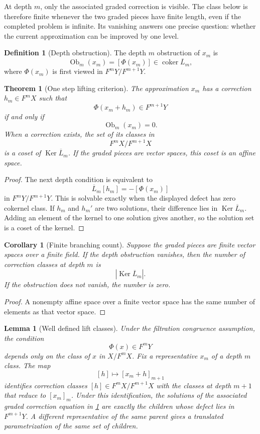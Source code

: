 \documentclass{aomart}
\newtheorem{theorem}{Theorem}[section]
\newtheorem{lemma}[lemma]{Lemma}
\newtheorem{corollary}[corollary]{Corollary}
\theoremstyle{definition}
\newtheorem{definition}[definition]{Definition}
\theoremstyle{remark}
\newcommand{\Ker}{\operatorname{Ker}}
\newcommand{\coker}{\operatorname{coker}}
\newcommand{\Ob}{\operatorname{Ob}}
\begin{document}
At depth $m$, only the associated graded correction is visible.  The class below is therefore finite whenever the two graded pieces have finite length, even if the completed problem is infinite.  Its vanishing answers one precise question: whether the current approximation can be improved by one level.

\begin{definition}[Depth obstruction]\label{def:depth_obstruction}
The depth $m$ obstruction of $x_m$ is
\[
\Ob_m(x_m)
=
[\Phi(x_m)]
\in
\coker\overline L_m,
\]
where $\Phi(x_m)$ is first viewed in $F^mY/F^{m+1}Y$.
\end{definition}

\begin{theorem}[One step lifting criterion]\label{thm:one_step_lifting}
The approximation $x_m$ has a correction $h_m\in F^mX$ such that
\[
\Phi(x_m+h_m)\in F^{m+1}Y
\]
if and only if
\[
\Ob_m(x_m)=0.
\]
When a correction exists, the set of its classes in
\[
F^mX/F^{m+1}X
\]
is a coset of $\Ker\overline L_m$.  If the graded pieces are vector spaces, this coset is an affine space.
\end{theorem}

\begin{proof}
The next depth condition is equivalent to
\[
\overline L_m[h_m]
=-[\Phi(x_m)]
\]
in $F^mY/F^{m+1}Y$.  This is solvable exactly when the displayed defect has zero cokernel class.  If $h_m$ and $h_m'$ are two solutions, their difference lies in $\Ker\overline L_m$.  Adding an element of the kernel to one solution gives another, so the solution set is a coset of the kernel.
\end{proof}

\begin{corollary}[Finite branching count]\label{cor:finite_branch_count}
Suppose the graded pieces are finite vector spaces over a finite field.  If the depth obstruction vanishes, then the number of correction classes at depth $m$ is
\[
|\Ker\overline L_m|.
\]
If the obstruction does not vanish, the number is zero.
\end{corollary}

\begin{proof}
A nonempty affine space over a finite vector space has the same number of elements as that vector space.
\end{proof}


\begin{lemma}[Well defined lift classes]\label{lem:well_defined_lift_classes}
Under the filtration congruence assumption, the condition
\[
\Phi(x)\in F^mY
\]
depends only on the class of $x$ in $X/F^mX$.  Fix a representative $x_m$ of a depth $m$ class.  The map
\[
[h]\longmapsto[x_m+h]_{m+1}
\]
identifies correction classes $[h]\in F^mX/F^{m+1}X$ with the classes at depth $m+1$ that reduce to $[x_m]_m$.  Under this identification, the solutions of the associated graded correction equation in \cref{thm:one_step_lifting} are exactly the children whose defect lies in $F^{m+1}Y$.  A different representative of the same parent gives a translated parametrization of the same set of children.
\end{lemma}
\end{document}
